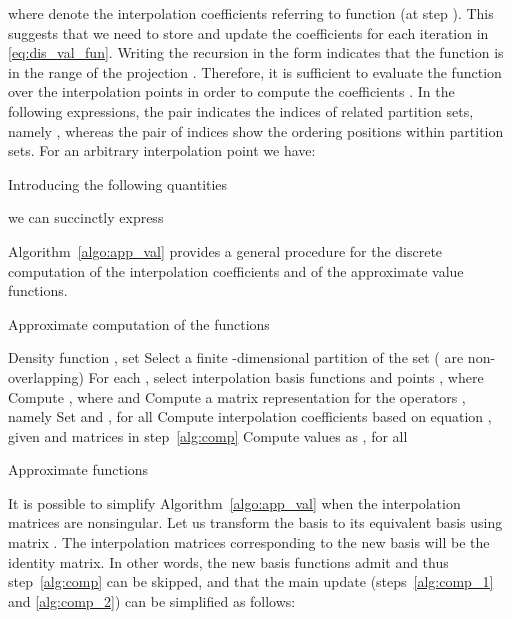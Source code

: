\documentclass{LMCS}
\begin{document}
where  denote the interpolation coefficients referring to function  (at step ).  
This suggests that we need to store and update the coefficients  for each iteration in \eqref{eq:dis_val_fun}.   
Writing the recursion in the form  indicates that the function  is in the range of the projection .
Therefore, it is sufficient to evaluate the function  over the interpolation points in order to compute the coefficients .  
In the following expressions, 
the pair  indicates the indices of related partition sets, 
namely ,
whereas the pair of indices  show the ordering positions within partition sets. 
For an arbitrary interpolation point  we have:

Introducing the following quantities

we can succinctly express 

Algorithm~\ref{algo:app_val} provides a general procedure for the discrete computation of the interpolation coefficients and of the approximate value functions.
\begin{algorithm}
\caption{Approximate computation of the functions }
\label{algo:app_val}
\begin{center}
\begin{algorithmic}[1]
\REQUIRE 
Density function , 
set  
\STATE
Select a finite -dimensional partition of the set 
( are non-overlapping)
\STATE
For each , select interpolation basis functions 
and points , where 
\STATE \label{alg:marginals}
Compute , where  and 
\STATE \label{alg:comp}
Compute a matrix representation for the operators , namely 
\STATE \label{alg:init_marginals}
 Set  and , for all 
\IF{}
\STATE \label{alg:comp_1} 
Compute interpolation coefficients  based on equation
,
given  and matrices  in step~\ref{alg:comp}
\STATE \label{alg:comp_2}
Compute values  as , for all 
\STATE

\ENDIF
\ENSURE
Approximate functions 
\end{algorithmic}
\end{center}
\end{algorithm}

It is possible to simplify Algorithm~\ref{algo:app_val} when the interpolation matrices  are nonsingular.
Let us transform the basis  to its equivalent basis using matrix . The interpolation matrices corresponding to the new basis will be the identity matrix. In other words, the new basis functions admit  and thus
step~\ref{alg:comp} can be skipped, 
and that the main update (steps~\ref{alg:comp_1} and \ref{alg:comp_2}) can be simplified as follows: 
\end{document}
